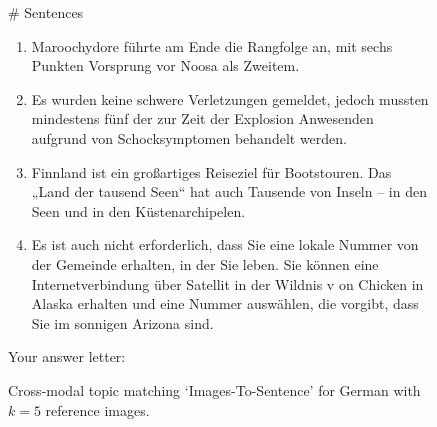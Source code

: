 \begin{figure}[ht]
\begin{adjustbox}{width=\columnwidth,center}
\begin{tcolorbox}
\medskip

\# Sentences

\begin{enumerate}[label=\Alph*., itemsep=0pt, topsep=0pt]
    \item \textasciigrave\textasciigrave\textasciigrave Maroochydore führte am Ende die Rangfolge an, mit sechs Punkten Vorsprung vor Noosa als Zweitem.\textasciigrave\textasciigrave\textasciigrave
    \item \textasciigrave\textasciigrave\textasciigrave 
    Es wurden keine schwere Verletzungen gemeldet, jedoch mussten mindestens fünf der zur Zeit der Explosion Anwesenden aufgrund von Schocksymptomen behandelt werden.\textasciigrave\textasciigrave\textasciigrave
    \item \textasciigrave\textasciigrave\textasciigrave 
    Finnland ist ein großartiges Reiseziel für Bootstouren. Das „Land der tausend Seen“ hat auch Tausende von Inseln – in den Seen und in den Küstenarchipelen.\textasciigrave\textasciigrave\textasciigrave
    \item \textasciigrave\textasciigrave\textasciigrave 
    Es ist auch nicht erforderlich, dass Sie eine lokale Nummer von der Gemeinde erhalten, in der Sie leben. Sie können eine Internetverbindung über Satellit in der Wildnis v on Chicken in Alaska erhalten und eine Nummer auswählen, die vorgibt, dass Sie im sonnigen Arizona sind.\textasciigrave\textasciigrave\textasciigrave
\end{enumerate}

Your answer letter: 
\end{tcolorbox}
\end{adjustbox}
\vspace{-0.7cm}
\caption{Cross-modal topic matching `Images-To-Sentence' for German with $k{=}5$ reference images.} 
\vspace{-0.8cm}
\label{fig:intro-prompt-i2s}
\end{figure}

